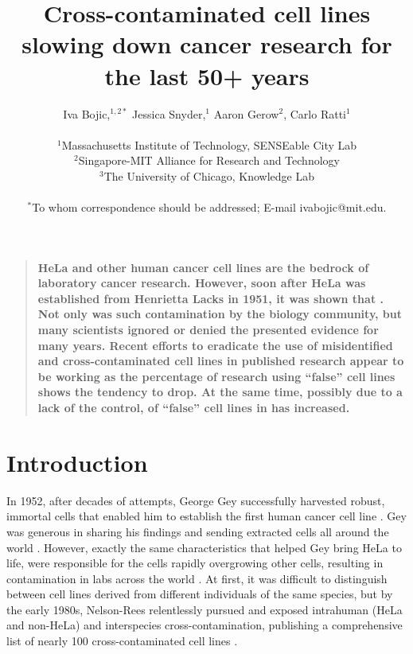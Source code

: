 \documentclass[12pt]{article}
\title{Cross-contaminated cell lines slowing down cancer research for the last 50+ years}
\author
{Iva Bojic,$^{1,2\ast}$ Jessica Snyder,$^{1}$ Aaron Gerow$^{2}$, Carlo Ratti$^{1}$\\
\\
\normalsize{$^{1}$Massachusetts Institute of Technology, SENSEable City Lab}\\
\normalsize{$^{2}$Singapore-MIT Alliance for Research and Technology}\\
\normalsize{$^{3}$The University of Chicago, Knowledge Lab}\\
\\
\normalsize{$^\ast$To whom correspondence should be addressed; E-mail ivabojic@mit.edu.}
}
\newenvironment{sciabstract}{%
\begin{quote} \bf}
{\end{quote}}
\begin{document}
 

\baselineskip24pt
\maketitle 

\begin{sciabstract}
HeLa and other human cancer cell lines are the bedrock of laboratory cancer research. However, soon after HeLa was established from Henrietta Lacks in 1951, it was shown that . Not only was such contamination  by the biology community, but many scientists ignored or denied the presented evidence for many years. Recent efforts to eradicate the use of misidentified and cross-contaminated cell lines in published research appear to be working as the percentage of research using ``false'' cell lines shows the tendency to drop. At the same time, possibly due to a lack of the control,  of ``false'' cell lines in  has increased.
\end{sciabstract}

 \newpage


\section*{Introduction}


In 1952, after decades of attempts, George Gey successfully harvested robust, immortal cells that enabled him to establish the first human cancer cell line \cite{gey1952tissue}. Gey was generous in sharing his findings and sending extracted cells all around the world \cite{culliton1974hela}. However, exactly the same characteristics that helped Gey bring HeLa to life, were responsible for the cells rapidly overgrowing other cells, resulting in contamination in labs across the world \cite{chatterjee2007cases}. At first, it was difficult to distinguish between cell lines derived from different individuals of the same species, but by the early 1980s, Nelson-Rees relentlessly pursued and exposed intrahuman (HeLa and non-HeLa) and interspecies cross-contamination, publishing a comprehensive list of nearly 100 cross-contaminated cell lines \cite{nelson1976hela, nelson1981cross}.
\end{document}
